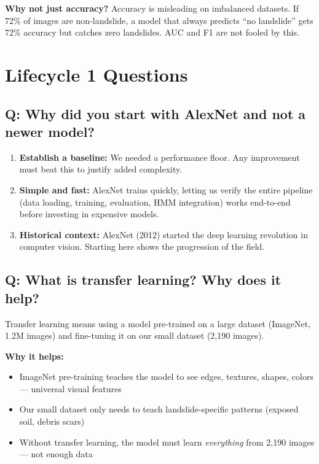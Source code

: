 \documentclass[11pt]{article}
\begin{document}
\textbf{Why not just accuracy?} Accuracy is misleading on imbalanced datasets. If 72\% of images are non-landslide, a model that always predicts ``no landslide'' gets 72\% accuracy but catches zero landslides. AUC and F1 are not fooled by this.

\section{Lifecycle 1 Questions}

\subsection{Q: Why did you start with AlexNet and not a newer model?}

\begin{enumerate}[noitemsep]
    \item \textbf{Establish a baseline:} We needed a performance floor. Any improvement must beat this to justify added complexity.
    \item \textbf{Simple and fast:} AlexNet trains quickly, letting us verify the entire pipeline (data loading, training, evaluation, HMM integration) works end-to-end before investing in expensive models.
    \item \textbf{Historical context:} AlexNet (2012) started the deep learning revolution in computer vision. Starting here shows the progression of the field.
\end{enumerate}

\subsection{Q: What is transfer learning? Why does it help?}

Transfer learning means using a model pre-trained on a large dataset (ImageNet, 1.2M images) and fine-tuning it on our small dataset (2,190 images).

\textbf{Why it helps:}
\begin{itemize}[noitemsep]
    \item ImageNet pre-training teaches the model to see edges, textures, shapes, colors --- universal visual features
    \item Our small dataset only needs to teach landslide-specific patterns (exposed soil, debris scars)
    \item Without transfer learning, the model must learn \textit{everything} from 2,190 images --- not enough data
\end{itemize}
\end{document}
